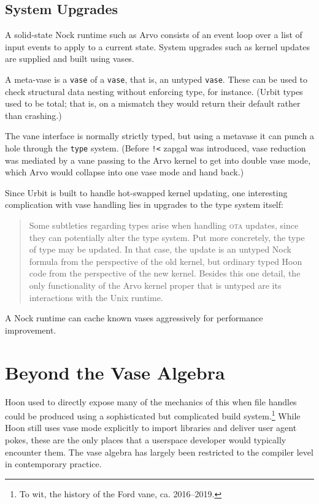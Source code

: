 \documentclass[twoside]{article}
\begin{document}
\subsection{System Upgrades}

A solid-state Nock runtime such as Arvo consists of an event loop over a list of input events to apply to a current state.  System upgrades such as kernel updates are supplied and built using vases.

A meta-vase is a \lstinline[style=inlinecode]{vase} of a \lstinline[style=inlinecode]{vase}, that is, an untyped \lstinline[style=inlinecode]{vase}.  These can be used to check structural data nesting without enforcing type, for instance.  (Urbit types used to be total; that is, on a mismatch they would return their default rather than crashing.)

The vane interface is normally strictly typed, but using a metavase it can punch a hole through the \lstinline[style=inlinecode]{type} system. (Before \lstinline[style=inlinecode]{!<} zapgal was introduced, vase reduction was mediated by a vane passing to the Arvo kernel to get into double vase mode, which Arvo would collapse into one vase mode and hand back.)

Since Urbit is built to handle hot-swapped kernel updating, one interesting complication with vase handling lies in upgrades to the type system itself:

\begin{quote}
Some subtleties regarding types arise when handling \textsc{ota} updates, since they can potentially alter the type system. Put more concretely, the type of type may be updated. In that case, the update is an untyped Nock formula from the perspective of the old kernel, but ordinary typed Hoon code from the perspective of the new kernel. Besides this one detail, the only functionality of the Arvo kernel proper that is untyped are its interactions with the Unix runtime.
\end{quote}

\noindent
A Nock runtime can cache known vases aggressively for performance improvement.

\section{Beyond the Vase Algebra}

Hoon used to directly expose many of the mechanics of this when file handles could be produced using a sophisticated but complicated build system.\footnote{To wit, the history of the Ford vane, ca. 2016–2019.}  While Hoon still uses vase mode explicitly to import libraries and deliver user agent pokes, these are the only places that a userspace developer would typically encounter them.  The vase algebra has largely been restricted to the compiler level in contemporary practice.
\end{document}
